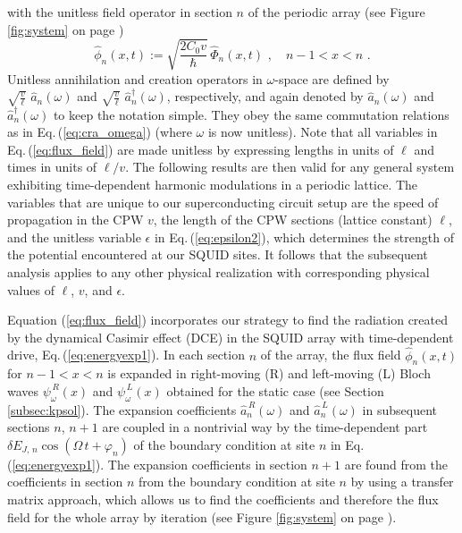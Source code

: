 %
with the unitless field operator in section $n$ of the periodic array 
(see Figure \ref{fig:system} on page \pageref{fig:system})
%
\begin{equation} \label{eq:ufo}
\hat{\phi}_n(x,t) := \sqrt{\frac{2 C_0 v}{\hbar}} \, \hat{\Phi}_n(x,t) \, \, , \quad n-1 < x < n \, \, .
\end{equation}
%
Unitless annihilation and creation operators in $\omega$-space are defined by 
$\displaystyle{\sqrt{\frac{v}{\ell}} \, \, \hat{a}_n(\omega)}$ 
and 
$\displaystyle{\sqrt{\frac{v}{\ell}} \, \, \hat{a}_n^\dagger(\omega)}$,
respectively, and again denoted by
%
$\hat{a}_n(\omega)$ and $\hat{a}_n^\dagger(\omega)$ to keep the notation simple. 
They obey the same commutation relations as in Eq.\,(\ref{eq:cra_omega}) (where $\omega$ is now unitless).
%
Note that all variables in Eq.\,(\ref{eq:flux_field}) are made unitless by expressing lengths in units of $\ell$ and times in units of $\ell/v$. The following results are then valid for any general system exhibiting time-dependent harmonic modulations in a periodic lattice. The variables that are unique to our superconducting circuit setup are the speed of propagation in the CPW $v$, the length of the CPW sections (lattice constant) $\ell$, 
and the unitless variable $\epsilon$ in Eq.\,(\ref{eq:epsilon2}), 
which determines the strength of the potential encountered at our SQUID sites. It follows that the subsequent analysis applies to any other physical realization with corresponding physical values of $\ell$, $v$, and $\epsilon$.

Equation (\ref{eq:flux_field}) incorporates our strategy to find the radiation created by the 
dynamical Casimir effect (DCE) in the SQUID array with time-dependent drive, Eq.\,(\ref{eq:energyexp1}). 
In each section $n$ of the array, the flux field $\hat{\phi}_n(x,t)$ for $n-1 < x < n$
is expanded in 
right-moving (R) and left-moving (L) Bloch waves $\psi_{\omega}^{\,R}(x)$ and $\psi_{\omega}^{\,L}(x)$ 
obtained for the static case (see Section \ref{subsec:kpsol}).
The expansion 
coefficients $\hat{a}_n^{\,R}(\omega)$ and $\hat{a}_n^{\,L}(\omega)$ 
in subsequent sections $n$, $n+1$ are coupled in a nontrivial way by the time-dependent 
part $\delta E_{J,\,n} \cos(\Omega \, t + \varphi_n)$ of the boundary condition at site $n$ in 
Eq.\,(\ref{eq:energyexp1}). 
The expansion coefficients in section $n+1$ are found from the coefficients in section $n$
from the boundary condition at site $n$ by using a transfer matrix approach, which allows 
us to find the coefficients and therefore the flux field for the whole array by iteration
(see Figure \ref{fig:system} on page \pageref{fig:system}). 


